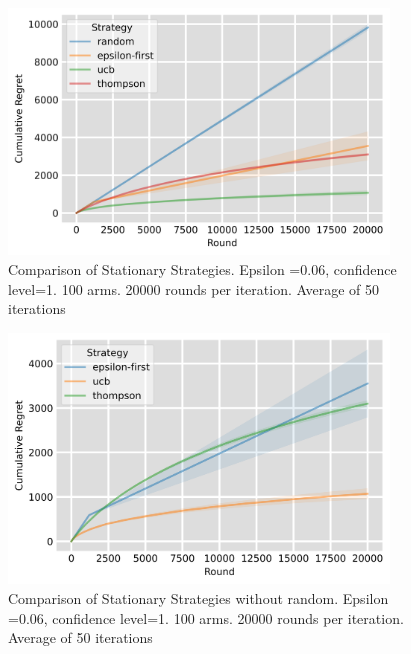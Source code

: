 \begin{figure}[h]
    \centering
    \includegraphics[width=0.9\textwidth]{figures/comparison_of_all_strategies_100_machines}
    \caption[Comparison of Stationary Strategies]{Comparison of Stationary Strategies. Epsilon =0.06, confidence level=1. 100 arms. 20000 rounds per iteration. Average of 50 iterations}
    \label{fig: all1}
\end{figure}

\begin{figure}[h]
    \centering
    \includegraphics[width=0.9\textwidth]{figures/comparison_without_random_100_machines}
    \caption[Comparison of Stationary Strategies without random]{Comparison of Stationary Strategies without random. Epsilon =0.06, confidence level=1. 100 arms. 20000 rounds per iteration. Average of 50 iterations}
    \label{fig: 100 arms without random}
\end{figure}

